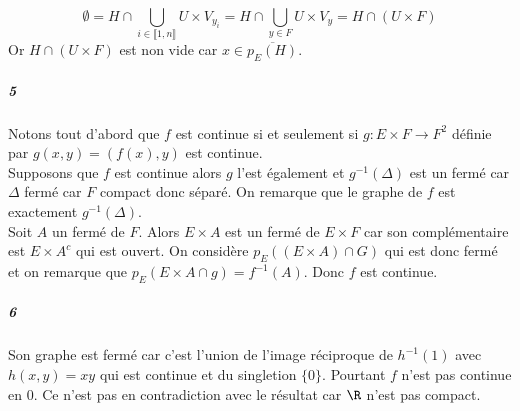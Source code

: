 \documentclass[10pt,a4paper]{article}
\begin{document}
  \[ \emptyset = H \cap \underset{i \in \llbracket 1,n \rrbracket}{\bigcup}U \times V_{y_i} = H \cap \underset{y \in F}{\bigcup}U \times V_{y} = H \cap (U \times F)\]
  Or $H \cap (U \times F)$ est non vide car $x \in \overline{p_E(H)}$.
  \subparagraph{5}Notons tout d'abord que $f$ est continue si et seulement si $g: E \times F \rightarrow F^2$ définie par $g(x,y) = (f(x),y)$ est continue.\\
  Supposons que $f$ est continue alors $g$ l'est également et $g^{-1}(\Delta)$ est un fermé car $\Delta$ fermé car $F$ compact donc séparé. On remarque que le graphe de $f$ est exactement $g^{-1}(\Delta)$.\\
  Soit $A$ un fermé de $F$. Alors $E \times A$ est un fermé de $E \times F$ car son complémentaire est $E \times A^c$ qui est ouvert. On considère $p_E((E\times A) \cap G)$ qui est donc fermé et on remarque que $p_E(E \times A \cap g) = f^{-1}(A)$. Donc $f$ est continue.
  \subparagraph{6}Son graphe est fermé car c'est l'union de l'image réciproque de $h^{-1}(1)$ avec $h(x,y) =xy$ qui est continue et du singletion $\lbrace 0 \rbrace$. Pourtant $f$ n'est pas continue en $0$. Ce n'est pas en contradiction avec le résultat car $\R$ n'est pas compact.
\end{document}
